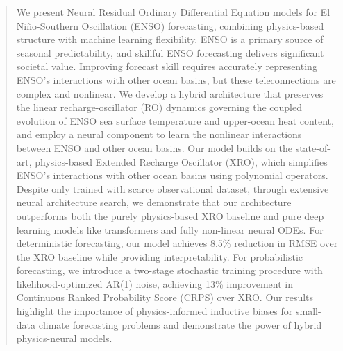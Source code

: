 \documentclass[sigconf,review]{acmart}
\newcommand{\1}{\mathbf{1}}
\begin{document}
\begin{abstract}
We present Neural Residual Ordinary Differential Equation models for El Ni\~no-Southern Oscillation (ENSO) forecasting, combining physics-based structure with machine learning flexibility. ENSO is a primary source of seasonal predictability, and skillful ENSO forecasting delivers significant societal value. Improving forecast skill requires accurately representing ENSO's interactions with other ocean basins, but these teleconnections are complex and nonlinear. We develop a hybrid architecture that preserves the linear recharge-oscillator (RO) dynamics governing the coupled evolution of ENSO sea surface temperature and upper-ocean heat content, and employ a neural component to learn the nonlinear interactions between ENSO and other ocean basins. Our model builds on the state-of-art, physics-based Extended Recharge Oscillator (XRO), which simplifies ENSO's interactions with other ocean basins using polynomial operators. Despite only trained with scarce observational dataset, through extensive neural architecture search, we demonstrate that our architecture outperforms both the purely physics-based XRO baseline and pure deep learning models like transformers and fully non-linear neural ODEs. For deterministic forecasting, our model achieves 8.5\% reduction in RMSE over the XRO baseline while providing interpretability. For probabilistic forecasting, we introduce a two-stage stochastic training procedure with likelihood-optimized AR(1) noise, achieving 13\% improvement in Continuous Ranked Probability Score (CRPS) over XRO. Our results highlight the importance of physics-informed inductive biases for small-data climate forecasting problems and demonstrate the power of hybrid physics-neural models.
\end{abstract}

\end{document}
